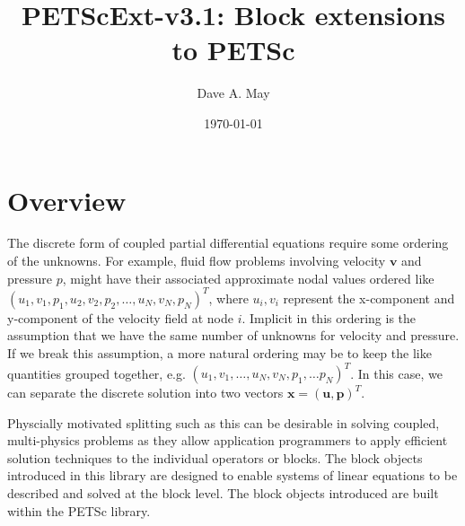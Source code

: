 \documentclass[10pt,a4paper]{amsart}
\renewcommand{\v}[1]{\boldsymbol{#1}}		%
\begin{document}
\title{PETScExt-v3.1: Block extensions to PETSc}
\begin{comment}
\author{Dave A. May \\
	Geophysical Fluid Dynamics, Department of Earth Sciences, \\
	ETH Z\"urich, Switzerland}
\end{comment}
\author{Dave A. May}
\address{Geophysical Fluid Dynamics, Department of Earth Sciences \\ ETH Z\"urich, Switzerland}
\date{\today}
\maketitle

\section{Overview}
	The discrete form of coupled partial differential equations require some ordering of the unknowns. For example, fluid flow problems involving velocity $\v v$ and pressure $p$, might have their associated approximate nodal values ordered like $( u_1, v_1, p_1, u_2, v_2, p_2, \dots, u_N, v_N, p_N )^T$, where $u_i, v_i$ represent the x-component and y-component of the velocity field at node $i$. Implicit in this ordering is the assumption that we have the same number of unknowns for velocity and pressure. If we break this assumption, a more natural ordering may be to keep the like quantities grouped together, e.g. $( u_1, v_1, \dots, u_N, v_N, p_1, \dots p_N )^T$. In this case, we can separate the discrete solution into two vectors $\v x = ( \v u, \v p )^T$. 
	
	Physcially motivated splitting such as this can be desirable in solving coupled, multi-physics problems as they allow application programmers to apply efficient solution techniques to the individual operators or blocks. The block objects introduced in this library are designed to enable systems of linear equations to be described and solved at the block level. The block objects introduced are built within the PETSc \cite{petsc-efficient} library. 
\end{document}
